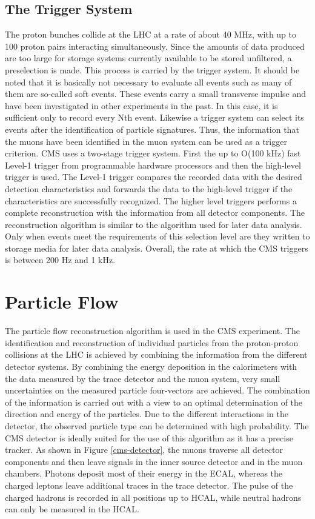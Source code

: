 \documentclass[12pt, a4paper]{thesis}
\begin{document}
\subsection{The Trigger System}
\label{sec:org9d9e9a7}
The proton bunches collide at the LHC at a rate of about 40 MHz, with
up to 100 proton pairs interacting simultaneously. Since the amounts
of data produced are too large for storage systems currently available
to be stored unfiltered, a preselection is made. This process is
carried by the trigger system. It should be noted that it is basically
not necessary to evaluate all events such as many of them are
so-called soft events. These events carry a small transverse impulse
and have been investigated in other experiments in the past. In this
case, it is sufficient only to record every Nth event. Likewise a
trigger system can select its events after the identification of
particle signatures. Thus, the information that the muons have been
identified in the muon system can be used as a trigger criterion. CMS
uses a two-stage trigger system. First the up to O(100 kHz) fast
Level-1 trigger from programmable hardware processors and then the
high-level trigger is used. The Level-1 trigger compares the recorded
data with the desired detection characteristics and forwards the data
to the high-level trigger if the characteristics are successfully
recognized. The higher level triggers performs a complete
reconstruction with the information from all detector components. The
reconstruction algorithm is similar to the algorithm used for later
data analysis. Only when events meet the requirements of this
selection level are they written to storage media for later data
analysis. Overall, the rate at which the CMS triggers is between 200
Hz and 1 kHz.

\section{Particle Flow}
\label{sec:eneryflow}

The particle flow reconstruction algorithm is used in the CMS
experiment. The identification and reconstruction of individual
particles from the proton-proton collisions at the LHC is achieved by
combining the information from the different detector systems. By
combining the energy deposition in the calorimeters with the data
measured by the trace detector and the muon system, very small
uncertainties on the measured particle four-vectors are achieved. The
combination of the information is carried out with a view to an
optimal determination of the direction and energy of the
particles. Due to the different interactions in the detector, the
observed particle type can be determined with high probability.  The
CMS detector is ideally suited for the use of this algorithm as it has
a precise tracker. As shown in Figure \ref{cms-detector}, the muons
traverse all detector components and then leave signals in the inner
source detector and in the muon chambers. Photons deposit most of
their energy in the ECAL, whereas the charged leptons leave additional
traces in the trace detector. The pulse of the charged hadrons is
recorded in all positions up to HCAL, while neutral hadrons can only
be measured in the HCAL.
\end{document}
